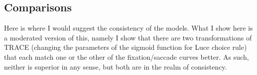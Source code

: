 \documentclass{article}
\begin{document}
%
%
%
%
%
%

\subsection{Comparisons}

Here is where I would suggest the consistency of the models. What I show here is a moderated version of this, namely I show that there are two transformations of TRACE (changing the parameters of the sigmoid function for Luce choice rule) that each match one or the other of the fixation/saccade curves better. As such, neither is superior in any sense, but both are in the realm of consistency.
\end{document}
